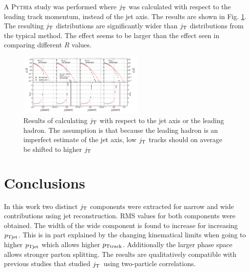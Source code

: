 A \textsc{Pythia} study was performed where $j_{\rm T}$ was calculated with respect to the leading track momentum, instead of the jet axis. The results are shown in Fig. \ref{fig:RefComparison}. The resulting $j_{\rm T}$ distributions are significantly wider than $j_{\rm T}$ distributions from the typical method. The effect seems to be larger than the effect seen in comparing different $R$ values.

\begin{figure}[htp]
\centering
\includegraphics[width=0.55\textwidth]{figures/results/JetVsLeadingRefConst.pdf}
\caption{Results of calculating $j_{\rm T}$ with respect to the jet axis or the leading hadron. The assumption is that because the leading hadron is an imperfect estimate of the jet axis, low $j_{\rm T}$ tracks should on average be shifted to higher $j_{\rm T}$}
\label{fig:RefComparison}
\end{figure}

\section{Conclusions}
\label{sec:conclusions}
In this work two distinct $j_{\rm T}$ components were extracted for narrow and wide contributions using jet reconstruction. RMS values for both components were obtained. The width of the wide component is found to increase for increasing $p_{\rm Tjet}$. This is in part explained by the changing kinematical limits when going to higher $p_{\rm Tjet}$ which allows higher $p_{\rm Ttrack}$. Additionally the larger phase space allows stronger parton splitting. The results are qualitatively compatible with previous studies that studied $j_{\rm T}$ using two-particle correlations.



